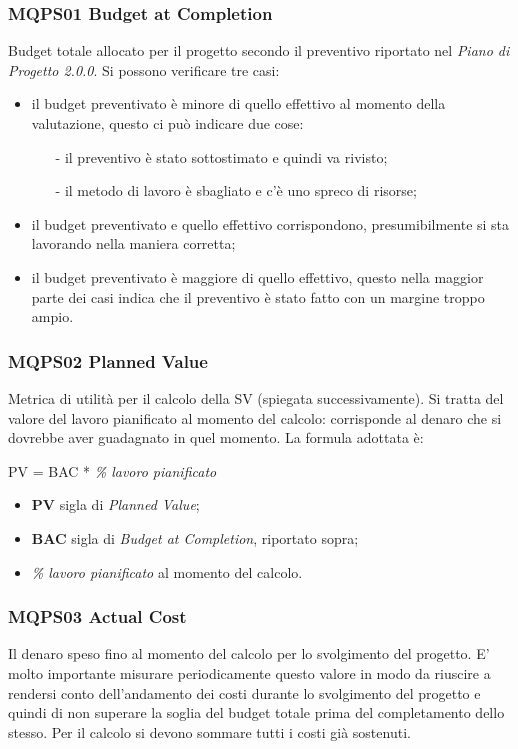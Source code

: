 \subsubsection{MQPS01 Budget at Completion}\label{ProcessiOrganizzativiProcessoDiPianificazioneMetricheMQPS01BudgetAtCompletion}
Budget totale allocato per il progetto secondo il preventivo riportato nel \textit{Piano di Progetto 2.0.0}.
Si possono verificare tre casi:
\begin{itemize}
	\item il budget preventivato è minore di quello effettivo al momento della valutazione, questo ci può indicare due cose:
	 \begin{itemize}
	 	\item[-] il preventivo è stato sottostimato e quindi va rivisto;
	 	\item[-] il metodo di lavoro è sbagliato e c’è uno spreco di risorse;
	 \end{itemize}
 	\item il budget preventivato e quello effettivo corrispondono, presumibilmente si sta lavorando nella maniera corretta;
 	\item il budget preventivato è maggiore di quello effettivo, questo nella maggior parte dei casi indica che il preventivo è stato fatto con un margine troppo ampio.
\end{itemize}

\subsubsection{MQPS02 Planned Value}\label{ProcessiOrganizzativiProcessoDiPianificazioneMetricheMQPS02PlannedValue}
Metrica di utilità per il calcolo della SV (spiegata successivamente).
Si tratta del valore del lavoro pianificato al momento del calcolo: corrisponde al denaro che
si dovrebbe aver guadagnato in quel momento.
La formula adottata è:  
	\begin{center}
		PV = BAC * \textit{\% lavoro pianificato}
	\end{center}
\begin{itemize}
	\item \textbf{PV} sigla di \textit{Planned Value};
	\item \textbf{BAC} sigla di \textit{Budget at Completion}, riportato sopra;
	\item \textit{\% lavoro pianificato} al momento del calcolo.
\end{itemize}

\subsubsection{MQPS03 Actual Cost}\label{ProcessiOrganizzativiProcessoDiPianificazioneMetricheMPQS03ActualCost}
Il denaro speso fino al momento del calcolo per lo svolgimento del progetto.
E’ molto importante misurare periodicamente questo valore in modo da riuscire a rendersi conto dell'andamento dei costi durante lo svolgimento del progetto e quindi di non superare la soglia del budget totale prima del completamento dello stesso.
Per il calcolo si devono sommare tutti i costi già sostenuti.

